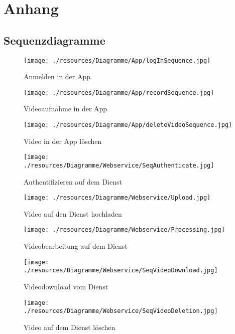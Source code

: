 \chapter{Anhang}

\section{Sequenzdiagramme}

\begin{figure}[ht]
	\centering
\texttt{[image: ./resources/Diagramme/App/logInSequence.jpg]}
\caption{Anmelden in der App}
	\label{fig:AppAuth}
\end{figure}

\begin{figure}[ht]
	\centering
\texttt{[image: ./resources/Diagramme/App/recordSequence.jpg]}
\caption{Videoaufnahme in der App}
	\label{fig:AppVideo}
\end{figure}

\begin{figure}[ht]
	\centering
\texttt{[image: ./resources/Diagramme/App/deleteVideoSequence.jpg]}
\caption{Video in der App löschen}
	\label{fig:AppDel}
\end{figure}

\begin{figure}[ht]
	\centering
\texttt{[image: ./resources/Diagramme/Webservice/SeqAuthenticate.jpg]}
\caption{Authentifizieren auf dem Dienst}
	\label{fig:ServiceAuth}
\end{figure}

\begin{figure}[ht]
	\centering
\texttt{[image: ./resources/Diagramme/Webservice/Upload.jpg]}
\caption{Video auf den Dienst hochladen}
	\label{fig:ServiceUpload}
\end{figure}

\begin{figure}[ht]
	\centering
\texttt{[image: ./resources/Diagramme/Webservice/Processing.jpg]}
\caption{Videobearbeitung auf dem Dienst}
	\label{fig:ServiceProcess}
\end{figure}

\begin{figure}[ht]
	\centering
\texttt{[image: ./resources/Diagramme/Webservice/SeqVideoDownload.jpg]}
\caption{Videodownload vom Dienst}
	\label{fig:ServiceDownl}
\end{figure}

\begin{figure}[ht]
	\centering
\texttt{[image: ./resources/Diagramme/Webservice/SeqVideoDeletion.jpg]}
\caption{Video auf dem Dienst löschen}
	\label{fig:ServiceDel}
\end{figure}